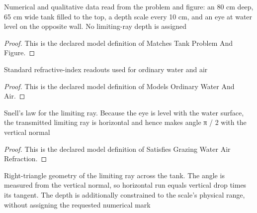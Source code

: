 \begin{definition}
  \label{def:physics:phyx-mini-0071:phyxminiproblems-problemphyxmini0071-matchestankproblemandfigure}
  Numerical and qualitative data read from the problem and figure: an 80 cm deep, 65 cm wide tank filled to the top, a depth scale every 10 cm, and an eye at water level on the opposite wall. No limiting-ray depth is assigned
\end{definition}
\begin{proof}
  This is the declared model definition of Matches Tank Problem And Figure.
\end{proof}
\begin{definition}
  \label{def:physics:phyx-mini-0071:phyxminiproblems-problemphyxmini0071-modelsordinarywaterandair}
  Standard refractive-index readouts used for ordinary water and air
\end{definition}
\begin{proof}
  This is the declared model definition of Models Ordinary Water And Air.
\end{proof}
\begin{definition}
  \label{def:physics:phyx-mini-0071:phyxminiproblems-problemphyxmini0071-satisfiesgrazingwaterairrefraction}
  Snell's law for the limiting ray. Because the eye is level with the water surface, the transmitted limiting ray is horizontal and hence makes angle π / 2 with the vertical normal
\end{definition}
\begin{proof}
  This is the declared model definition of Satisfies Grazing Water Air Refraction.
\end{proof}
\begin{definition}
  \label{def:physics:phyx-mini-0071:phyxminiproblems-problemphyxmini0071-satisfieslimitingsightlinegeometry}
  Right-triangle geometry of the limiting ray across the tank. The angle is measured from the vertical normal, so horizontal run equals vertical drop times its tangent. The depth is additionally constrained to the scale's physical range, without assigning the requested numerical mark
\end{definition}

